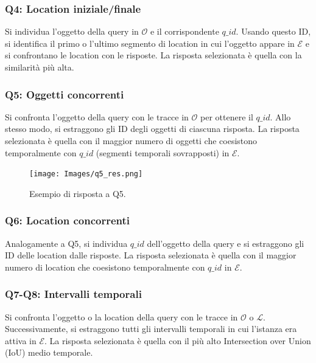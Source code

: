 \subsubsection*{Q4: Location iniziale/finale}
Si individua l'oggetto della query in $\mathcal{O}$ e il corrispondente $q\_id$. Usando questo ID, si identifica il primo o l'ultimo segmento di location in cui l'oggetto appare in $\mathcal{E}$ e si confrontano le location con le risposte. La risposta selezionata è quella con la similarità più alta.

\subsubsection*{Q5: Oggetti concorrenti}
Si confronta l'oggetto della query con le tracce in $\mathcal{O}$ per ottenere il $q\_id$. Allo stesso modo, si estraggono gli ID degli oggetti di ciascuna risposta. La risposta selezionata è quella con il maggior numero di oggetti che coesistono temporalmente con $q\_id$ (segmenti temporali sovrapposti) in $\mathcal{E}$.

\begin{figure}[H]
    \centering
    \texttt{[image: Images/q5\_res.png]}
    \caption{Esempio di risposta a Q5.}
    \label{fig:q5_example}
\end{figure}

\subsubsection*{Q6: Location concorrenti}
Analogamente a Q5, si individua $q\_id$ dell'oggetto della query e si estraggono gli ID delle location dalle risposte. La risposta selezionata è quella con il maggior numero di location che coesistono temporalmente con $q\_id$ in $\mathcal{E}$.

\subsubsection*{Q7-Q8: Intervalli temporali}
Si confronta l'oggetto o la location della query con le tracce in $\mathcal{O}$ o $\mathcal{L}$. Successivamente, si estraggono tutti gli intervalli temporali in cui l'istanza era attiva in $\mathcal{E}$. La risposta selezionata è quella con il più alto Intersection over Union (IoU) medio temporale.